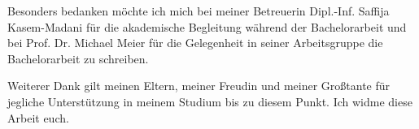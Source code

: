 Besonders bedanken möchte ich mich bei meiner Betreuerin Dipl.-Inf. Saffija Kasem-Madani für die akademische Begleitung während der Bachelorarbeit und bei Prof. Dr. Michael Meier für die Gelegenheit in seiner Arbeitsgruppe die Bachelorarbeit zu schreiben.

Weiterer Dank gilt meinen Eltern, meiner Freudin und meiner Großtante für jegliche Unterstützung in meinem Studium bis zu diesem Punkt. Ich widme diese Arbeit euch.


